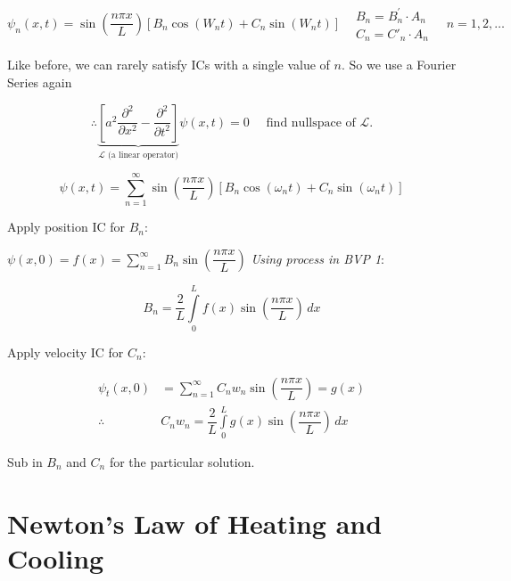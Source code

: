 \documentclass{report}
\begin{document}
$$
\psi_{n}(x, t)=\sin \left(\dfrac{n \pi x}{L}\right)\left[B_{n} \cos \left(W_{n} t\right)+C_{n} \sin (W_n t)\right] \begin{aligned}
& B_{n}=B_{n}^{\prime} \cdot A_{n} \\ 
& C_{n}=C'_{n} \cdot A_{n}
\end{aligned}\quad n=1,2, \ldots
$$

Like before, we can rarely satisfy ICs with a single value of $n$. So we use a Fourier Series again

$$
\therefore\underbrace{\left[a^{2} \dfrac{\partial^{2}}{\partial x^{2}}-\dfrac{\partial^{2}}{\partial t^{2}}\right]}_{\mathcal{L}\text{ (a linear operator)}} \psi(x, t)=0\quad \text { find nullspace of } \mathcal{L}.
$$

\[
\boxed{
\psi(x, t) = \sum\limits_{n=1}^{\infty} \sin\left(\dfrac{n \pi x}{L}\right) \left[ B_{n} \cos\left(\omega_{n} t\right) + C_{n} \sin\left(\omega_{n} t\right) \right]
}
\]

Apply position IC for $B_n$:

$\psi(x, 0)=f(x)=\sum\limits_{n=1}^{\infty} B_{n} \sin \left(\dfrac{n \pi x}{L}\right)$ \textit{Using process in BVP 1}:

\[
\boxed{
B_{n} = \dfrac{2}{L} \int\limits_{0}^{L} f{(x)} \sin\left(\dfrac{n \pi x}{L}\right) \, dx
}
\]

Apply velocity IC for $C_{n}$:

\[
\begin{aligned}
\psi_{t}(x, 0) &= \sum\limits_{n=1}^{\infty} C_{n} w_{n} \sin \left( \dfrac{n \pi x}{L} \right) = g(x) \\
\therefore\ & \boxed{ C_{n} w_{n} = \dfrac{2}{L} \int\limits_{0}^{L} g(x) \sin \left( \dfrac{n \pi x}{L} \right) \, dx }
\end{aligned}
\]

Sub in $B_{n}$ and $C_{n}$ for the particular solution.

\section{Newton's Law of Heating and Cooling}
\end{document}
